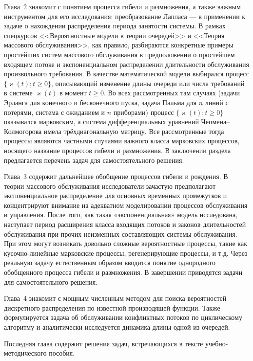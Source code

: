\documentclass[14pt]{extarticle}
\theoremstyle{theorem}
\theoremstyle{remark}
\begin{document}
Глава~2 знакомит с понятием процесса гибели и размножения, а также важным инструментом для его исследования: преобразование Лапласа --- в применении к задаче о нахождении распределения периода занятости системы. В рамках спецкурсов <<Вероятностные модели в теории очередей>> и <<Теория
массового обслуживания>>, как правило, разбираются конкретные примеры простейших систем
массового обслуживания в предположении о простейшем входящем потоке и
экспоненциальном распределении длительности обслуживания произвольного
требования. В качестве математической модели выбирался процесс $\{\varkappa(t);
t\geqslant0\}$, описывающий изменение длины очереди или числа требований в
системе $\varkappa(t)$ в момент $t\geqslant0$. Во всех рассмотренных там случаях
(задачи Эрланга для конечного и бесконечного пуска, задача Пальма для $n$ линий
с потерями, система с ожиданием и $n$ приборами) процесс $\{\varkappa(t);
t\geqslant0\}$ оказывался марковским, а система дифференциальных уравнений
Чепмена--Колмогорова имела трёхдиагональную матрицу. Все рассмотренные тогда
процессы являются частными случаями важного класса марковских процессов,
носящего название процессов гибели и размножения. В заключении раздела предлагается перечень задач для самостоятельного решения.

Глава~3 содержит дальнейшее обобщение процессов гибели и рождения. В теории массового обслуживания исследователи зачастую предполагают экспоненциальное распределение для основных временных промежутков и концентрируют внимание на адекватном моделировании процессов обслуживания и управления. После того, как такая «экспоненциальная» модель исследована, наступает период расширения класса входящих потоков и законов длительностей обслуживания при прочих неизменных составляющих системы обслуживания. При этом могут возникать довольно сложные вероятностные процессы, такие как кусочно-линейные марковские процессы, регенерирующие процессы, и т.д. Через реальную задачу естественным образом вводится понятие однородного обобщенного процесса гибели и размножения. В завершении приводятся задачи для самостоятельного решения.

Глава~4 знакомит с мощным численным методом для поиска вероятностей дискретного распределения по известной производящей функции. Также формулируется задача об обслуживании конфликтных потоков по циклическому алгоритму и аналитически исследуется динамика длины одной из очередей.

Последняя глава содержит решения задач, встречающихся в тексте учебно-методического пособия.
\end{document}
